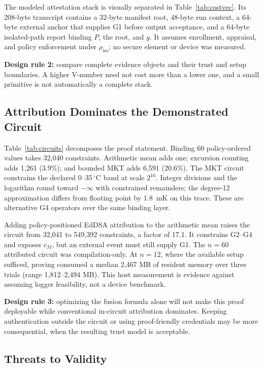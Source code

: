 The modeled attestation stack is visually separated in Table~\ref{tab:costvec}.
Its 208-byte transcript contains a 32-byte manifest root, 48-byte run context,
a 64-byte external anchor that supplies G1 before output acceptance, and a
64-byte isolated-path report binding $P$, the root, and $y$. It assumes enrollment, appraisal, and
policy enforcement under $\rho_{\mathrm{iso}}$; no secure element or device was
measured.

\textbf{Design rule 2:} compare complete evidence objects and their trust and
setup boundaries. A higher V-number need not cost more than a lower one, and a
small primitive is not automatically a complete stack.

\subsection{Attribution Dominates the Demonstrated Circuit}

Table~\ref{tab:circuits} decomposes the proof statement. Binding 60
policy-ordered values takes 32,040 constraints. Arithmetic mean adds one;
excursion counting adds 1,261 (3.9\%); and bounded MKT adds 6,591 (20.6\%). The
MKT circuit constrains the declared 0--35\,$^{\circ}$C band at scale $2^{16}$.
Integer divisions and the logarithm round toward $-\infty$ with constrained
remainders; the degree-12 approximation differs from floating point by 1.8~mK
on this trace. These are alternative
G4 operators over the same binding layer.



Adding policy-positioned EdDSA attribution to the arithmetic mean raises the
circuit from 32,041 to 549,392 constraints, a factor of 17.1. It constrains
G2--G4 and exposes $c_M$, but an external event must still supply G1. The
$n=60$ attributed circuit was compilation-only. At $n=12$, where the available
setup sufficed, proving consumed a median 2,467 MB of resident memory over three
trials (range 1,812--2,494 MB). This host measurement is evidence against
assuming logger feasibility, not a device benchmark.

\textbf{Design rule 3:} optimizing the fusion formula alone will not make this
proof deployable while conventional in-circuit attribution dominates. Keeping
authentication outside the circuit or using proof-friendly credentials may be
more consequential, when the resulting trust model is acceptable.

\subsection{Threats to Validity}

